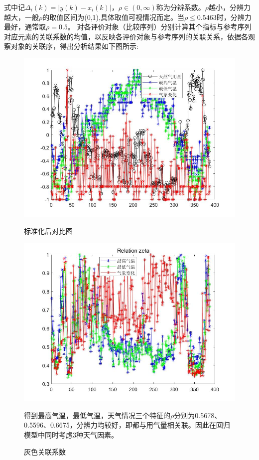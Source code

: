 \documentclass{whutmod}
\begin{document}
	
	式中记$\Delta _{i}(k)=|y(k)-x_{i}(k)|$，$\rho \in (0,\infty )$称为分辨系数。$\rho $越小，分辨力越大，一般$\rho $的取值区间为(0,1),具体取值可视情况而定。当$\rho \leqslant  0.5463$时，分辨力最好，通常取$\rho =0.5$。
	对各评价对象（比较序列）分别计算其个指标与参考序列对应元素的关联系数的均值，以反映各评价对象与参考序列的关联关系，依据各观察对象的关联序，得出分析结果如下图所示:
	\begin{figure}[H]
	\begin{minipage}[t]{0.5\linewidth}
		\centering
		\includegraphics[width=\textwidth]{figures/gld1.jpg}
		\caption{标准化后对比图}
	\end{minipage}%
	\begin{minipage}[t]{0.5\linewidth}
		\centering
		\includegraphics[width=\textwidth]{figures/gld2.jpg}
		\caption{灰色关联系数}
	\end{minipage}

	得到最高气温，最低气温，天气情况三个特征的$\rho $分别为0.5678、0.5596、0.6675，分辨力均较好，即都与用气量相关联。因此在回归模型中同时考虑3种天气因素。
\end{figure}
\end{document}
